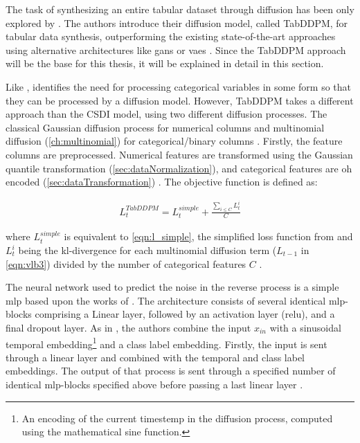 The task of synthesizing an entire tabular dataset through diffusion has been only explored by \textcite{kotelnikov2022TabDDPMModellingTabular}.
The authors introduce their diffusion model, called TabDDPM, for tabular data synthesis, outperforming the existing state-of-the-art approaches using alternative architectures like \glspl{gan} or \glspl{vae} \cite{kotelnikov2022TabDDPMModellingTabular}. 
Since the TabDDPM approach will be the base for this thesis, it will be explained in detail in this section.

Like \textcite{zheng2022DiffusionModelsMissing}, \textcite{kotelnikov2022TabDDPMModellingTabular} identifies the need for processing categorical variables in some form so that they can be processed by a diffusion model.
However, TabDDPM takes a different approach than the CSDI model, using two different diffusion processes.
The classical Gaussian diffusion process \cite{ho2020DenoisingDiffusionProbabilistic} for numerical columns and multinomial diffusion \cite{hoogeboom2021ArgmaxFlowsMultinomial} (\autoref{ch:multinomial}) for categorical/binary columns \cite{zheng2022DiffusionModelsMissing}.
Firstly, the feature columns are preprocessed.
Numerical features are transformed using the Gaussian quantile transformation (\autoref{sec:dataNormalization}), and categorical features are \gls{oh} encoded (\autoref{sec:dataTransformation}) \cite{kotelnikov2022TabDDPMModellingTabular}.
The objective function is defined as:

\begin{equation}
    \label{eqn:tabddpm_loss}
    \begin{align*}
        L^{TabDDPM}_{t} =L^{simple}_t + \frac{\sum_{i \leq C}^{}L^i_{t}}{C}
    \end{align*}
\end{equation}

where $L^{simple}_t$ is equivalent to \autoref{eqn:l_simple}, the simplified loss function from \textcite{ho2020DenoisingDiffusionProbabilistic} and $L^i_{t}$ being the \gls{kl}-divergence for each multinomial diffusion term ($L_{t-1}$ in \autoref{eqn:vlb3}) divided by the number of categorical features $C$ \cite{kotelnikov2022TabDDPMModellingTabular}.

The neural network used to predict the noise in the reverse process is a simple \gls{mlp} based upon the works of \cite{gorishniy2021RevisitingDeepLearning}.
The architecture consists of several identical \gls{mlp}-blocks comprising a Linear layer, followed by an activation layer (\gls{relu}), and a final dropout layer. 
As in \cite{nichol2021ImprovedDenoisingDiffusion, dhariwal2021DiffusionModelsBeat}, the authors combine the input $x_{in}$ with a sinusoidal temporal embedding\footnote{An encoding of the current timestemp in the diffusion process, computed using the mathematical sine function.} and a class label embedding.
Firstly, the input is sent through a linear layer and combined with the temporal and class label embeddings.
The output of that process is sent through a specified number of identical \gls{mlp}-blocks specified above before passing a last linear layer \cite{kotelnikov2022TabDDPMModellingTabular}.

